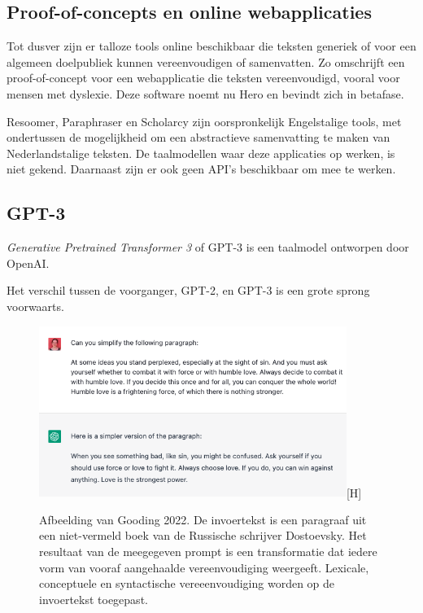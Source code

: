 
\subsection{Proof-of-concepts en online webapplicaties}

Tot dusver zijn er talloze tools online beschikbaar die teksten generiek of voor een algemeen doelpubliek kunnen vereenvoudigen of samenvatten. Zo omschrijft \textcite{Bingel2018} een proof-of-concept voor een webapplicatie die teksten vereenvoudigd, vooral voor mensen met dyslexie. Deze software noemt nu Hero en bevindt zich in betafase.

Resoomer, Paraphraser en Scholarcy zijn oorspronkelijk Engelstalige tools, met ondertussen de mogelijkheid om een abstractieve samenvatting te maken van Nederlandstalige teksten. De taalmodellen waar deze applicaties op werken, is niet gekend. Daarnaast zijn er ook geen API's beschikbaar om mee te werken. %




\subsection{GPT-3}

\textit{Generative Pretrained Transformer 3} of GPT-3 is een taalmodel ontworpen door OpenAI. 

Het verschil tussen de voorganger, GPT-2, en GPT-3 is een grote sprong voorwaarts.



\begin{figure}
	\includegraphics[width=10cm]{img/chatgpt-example-simplification-gooding.png}[H]
	\caption{Afbeelding van Gooding 2022. De invoertekst is een paragraaf uit een niet-vermeld boek van de Russische schrijver Dostoevsky. Het resultaat van de meegegeven prompt is een transformatie dat iedere vorm van vooraf aangehaalde vereenvoudiging weergeeft. Lexicale, conceptuele en syntactische vereeenvoudiging worden op de invoertekst toegepast.}
\end{figure}

